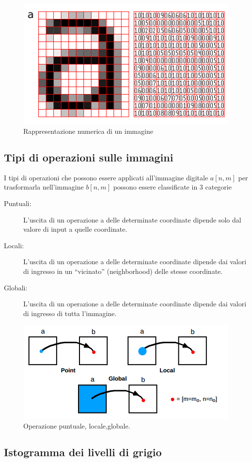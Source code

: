 \begin{figure}
\centering
\includegraphics[width=.5\textwidth]{img/image-grid.png}
\caption{Rappresentazione numerica di un immagine}\label{fig:image-grid}
\end{figure}

\subsection{Tipi di operazioni sulle immagini}
I tipi di operazioni che possono essere applicati all'immagine digitale $a[n,m]$
per trasformarla nell'immagine $b[n,m]$ possono essere classificate in 3 categorie \cite{Parker:2010:AIP:1965423}

\begin{description}
\item[Puntuali:] 	L'uscita di un operazione a delle determinate coordinate dipende solo dal valore di input a quelle coordinate.
\item[Locali: ] L'uscita di un operazione a delle determinate coordinate dipende dai valori di ingresso in un ``vicinato'' (neighborhood) delle stesse coordinate.
\item[Globali: ] L'uscita di un operazione a delle determinate coordinate dipende dai valori di ingresso di tutta l'immagine.
\end{description}


\begin{figure}
\centering
\includegraphics[width=.5\textwidth]{img/puntuale-locale-globale.png}
\caption{Operazione puntuale, locale,globale.}\label{fig:puntuale-locale-globale}
\end{figure}

\subsection{Istogramma dei livelli di grigio}

